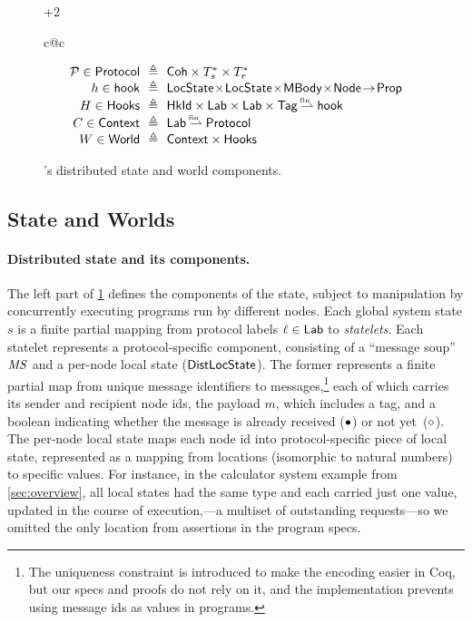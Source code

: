 \begin{figure}[t]
{\begin{varwidth}{\dimexpr\textwidth+2\fboxrule\relax}
\begin{tabular}{c@{\!\!\!\!\!\!\!\!\!\!}c}
\begin{minipage}{0.5\linewidth}
{{\[\begin{array}{r@{\ \ }c@{\ \ }l}
  \ppr \in \Protocol & \eqdef & \mathsf{Coh} \times \Transitions_s^*
                                      \times \Transitions_r^* \\
  h \in \hook & \eqdef & \LocalState \!\times\! \LocalState \!\times\! \Mbody
                         \!\times\! \Node \!\fun\! \Prop \\
  H \in \Hooks & \eqdef & \HkId \times \Lab \times \Lab \times \Tag \pmap \hook \\
  C \in \Context & \eqdef & \Lab \pmap \Protocol \\
  W \in \World & \eqdef & \Context \times \Hooks
\end{array}
\]
}}
\end{minipage}
\end{tabular}
\end{varwidth}}
\vspace{-5pt}
\caption{\disel's distributed state and world components.}
\label{fig:sspace}
\end{figure}



\subsection{State and Worlds}
\label{sec:model}

\paragraph{Distributed state and its components.}

The left part of \cref{fig:sspace} defines the components of the
state, subject to manipulation by concurrently executing programs run
by different nodes. Each global system state $s$ is a finite partial
mapping from protocol labels $\ell \in \mathsf{Lab}$ to \emph{statelets}. Each
statelet represents a protocol-specific component, consisting of a
``message soup'' $\mathit{MS}$ and a per-node local state ($\mathsf{DistLocState}$). The
former represents a finite partial map from unique message identifiers
to messages,\footnote{The uniqueness constraint is introduced to make
  the encoding easier in Coq, but our specs and proofs do not rely on
  it, and the implementation prevents using message ids as values in
  programs.} each of which carries its sender and recipient node ids,
the payload $m$, which includes a tag, and a boolean indicating
whether the message is already received ($\bullet$) or not
yet~($\circ$).
%
The per-node local state maps each node id into protocol-specific
piece of local state, represented as a mapping from locations
(isomorphic to natural numbers) to specific values. For instance, in
the calculator system example from \cref{sec:overview}, all
local states had the same type and each carried just one value,
updated in the course of execution,---a multiset of outstanding
requests---so we omitted the only location from assertions in the
program specs.


